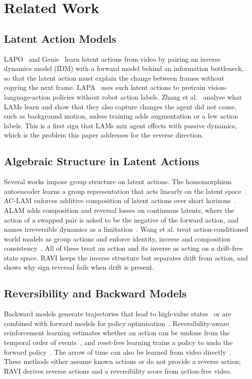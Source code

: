 \documentclass{jcse}
\newcommand{\method}{RAVI}
\begin{document}
\section{Related Work} \label{s:related}

\subsection{Latent Action Models}
LAPO~\cite{schmidt2024lapo} and Genie~\cite{bruce2024genie} learn latent actions from video by pairing an inverse dynamics model (IDM) with a forward model behind an information bottleneck, so that the latent action must explain the change between frames without copying the next frame.
LAPA~\cite{ye2025lapa} uses such latent actions to pretrain vision-language-action policies without robot action labels.
Zhang et al.~\cite{zhang2025lams} analyse what LAMs learn and show that they also capture changes the agent did not cause, such as background motion, unless training adds augmentation or a few action labels.
This is a first sign that LAMs mix agent effects with passive dynamics, which is the problem this paper addresses for the reverse direction.

\subsection{Algebraic Structure in Latent Actions}
Several works impose group structure on latent actions.
The homomorphism autoencoder learns a group representation that acts linearly on the latent space~\cite{keurti2023hae}.
AC-LAM enforces additive composition of latent actions over short horizons~\cite{wei2026aclam}.
ALAM adds composition and reversal losses on continuous latents, where the action of a swapped pair is asked to be the negative of the forward action, and names irreversible dynamics as a limitation~\cite{tang2026alam}.
Wang et al. treat action-conditioned world models as group actions and enforce identity, inverse and composition consistency~\cite{wang2026groupactions}.
All of these treat an action and its inverse as acting on a drift-free state space.
{\method} keeps the inverse structure but separates drift from action, and shows why sign reversal fails when drift is present.

\subsection{Reversibility and Backward Models}
Backward models generate trajectories that lead to high-value states~\cite{goyal2019recall} or are combined with forward models for policy optimisation~\cite{lai2020bmpo}.
Reversibility-aware reinforcement learning estimates whether an action can be undone from the temporal order of events~\cite{grinsztajn2021reversibility}, and reset-free learning trains a policy to undo the forward policy~\cite{eysenbach2018leave}.
The arrow of time can also be learned from video directly~\cite{wei2018arrow}.
These methods either assume known actions or do not provide a reverse action; {\method} derives reverse actions and a reversibility score from action-free video.
\end{document}
